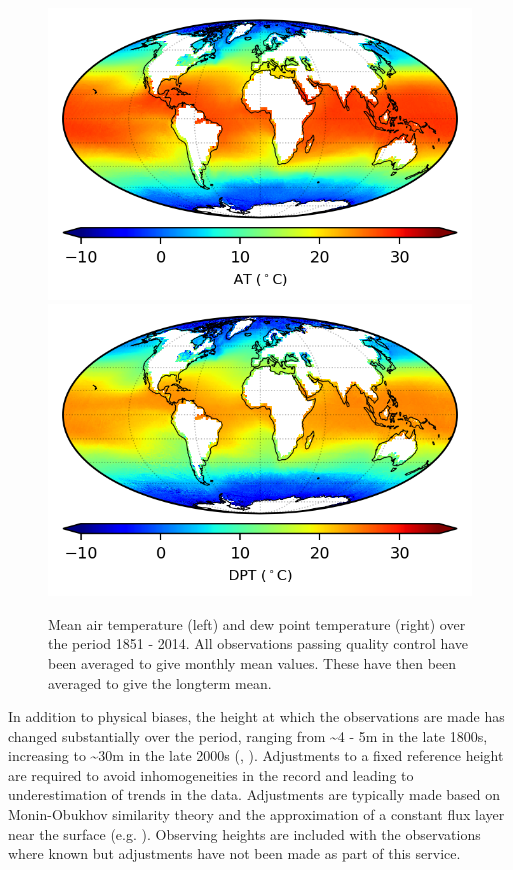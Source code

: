 \begin{figure}[h]
    \centering
    \includegraphics{resources/observations-at-mean-map-optimal.png}
    \includegraphics{resources/observations-dpt-mean-map-optimal.png}
    \caption{Mean air temperature (left) and dew point temperature (right) over the period 1851 - 2014. All observations passing quality control have been averaged to give monthly mean values. These have then been averaged to give the longterm mean.}
    \label{fig:at-map}
\end{figure}

In addition to physical biases, the height at which the observations are made has changed substantially over the period, ranging from \sim 4 - 5m in the late 1800s, increasing to \sim 30m in the late 2000s (\cite{Kent2007}, \cite{ Kent2013NMAT}). 
Adjustments to a fixed reference height are required to avoid inhomogeneities in the record and leading to underestimation of trends in the data. 
Adjustments are typically made based on Monin-Obukhov similarity theory and the approximation of a constant flux layer near the surface (e.g. \cite{Businger1971}). 
Observing heights are included with the observations where known but adjustments have not been made as part of this service.

